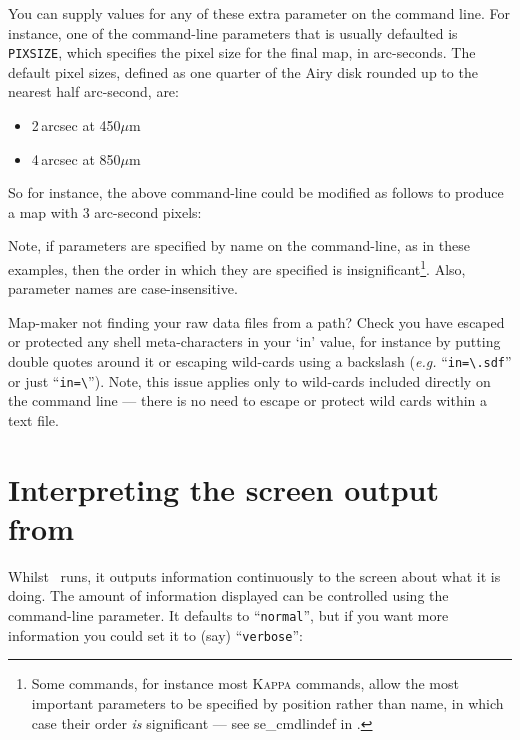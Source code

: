 You can supply values for any of these extra parameter on the command
line. For instance, one of the command-line parameters that is usually
defaulted is \texttt{PIXSIZE}, which specifies the pixel size for the final
map, in arc-seconds. The default pixel sizes, defined as one quarter of the
Airy disk rounded up to the nearest half arc-second, are:

\begin{itemize}
\item 2\,arcsec at 450$\mu$m
\item 4\,arcsec at 850$\mu$m
\end{itemize}

So for instance, the above command-line could be modified as follows to
produce a map with 3 arc-second pixels:


Note, if parameters are specified by name on the command-line, as
in these examples, then the order in which they are specified is
insignificant\footnote{Some commands, for instance most \textsc{Kappa}
commands, allow the most important parameters to be specified by position
rather than name, in which case their order \emph{is} significant ---
see 
{se_cmdlindef} in .}. Also, parameter names are
case-insensitive.

\begin{tip}
  Map-maker not finding your raw data files from a path? Check you have
  escaped or protected any shell meta-characters in your `in' value,
  for instance by putting double quotes around it or escaping
  wild-cards using a backslash (\emph{e.g.} ``\texttt{in=\textbackslash*.sdf}''
  or just ``\texttt{in=\textbackslash*}''). Note, this issue applies only to
  wild-cards included directly on the command line --- there is no need to
  escape or protect wild cards within a text file.
\end{tip}

\section{Interpreting the screen output from }

Whilst \makemap\ runs, it outputs information continuously to the screen
about what it is doing. The amount of information displayed can be
controlled using the  command-line
parameter. It defaults to ``\texttt{normal}'', but if you want more
information you could set it to (say) ``\texttt{verbose}'':

